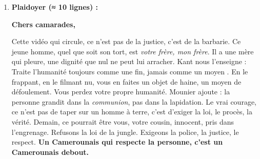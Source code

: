 \documentclass[11pt]{article}
\begin{document}
\begin{corrige}
\begin{enumerate}
\item \textbf{Plaidoyer (≈ 10 lignes) :}
\par \textbf{Chers camarades,} \\
\par Cette vidéo qui circule, ce n'est pas de la justice, c'est de la barbarie. Ce jeune homme, quel que soit son tort, est \emph{votre frère, mon frère}. Il a une mère qui pleure, une dignité que nul ne peut lui arracher. Kant nous l'enseigne : \guillemotleft Traite l'humanité toujours comme une fin, jamais comme un moyen \guillemotright. En le frappant, en le filmant nu, vous en faites un objet de haine, un moyen de défoulement. Vous perdez votre propre humanité. Mounier ajoute : la personne grandit dans la \emph{communion}, pas dans la lapidation. Le vrai courage, ce n'est pas de taper sur un homme à terre, c'est d'exiger la loi, le procès, la vérité. Demain, ce pourrait être vous, votre cousin, innocent, pris dans l'engrenage. Refusons la loi de la jungle. Exigeons la police, la justice, le respect. \textbf{Un Camerounais qui respecte la personne, c'est un Camerounais debout.}
\end{enumerate}
\end{corrige}
\end{document}
